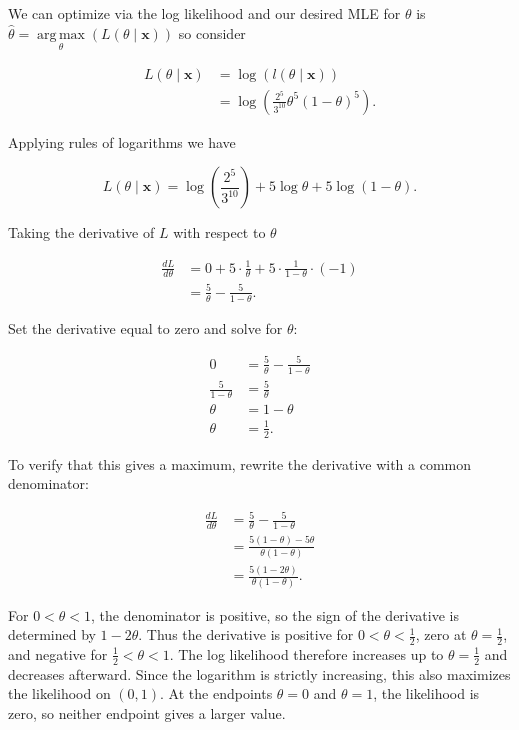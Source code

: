 \documentclass[12pt]{article}
\begin{document}
\begin{enumerate}
We can optimize via the log likelihood and our desired MLE for $\theta$ is $\hat{\theta} = \operatorname*{arg\,max}\limits_{\theta}\left( L(\theta \mid \mathbf{x})\right)$ so consider 

\[
\begin{aligned}
L(\theta \mid \mathbf{x})
&= \log\left(l(\theta \mid \mathbf{x})\right) \\
&= \log\left(\frac{2^5}{3^{10}}\theta^5(1-\theta)^5\right).
\end{aligned}
\]

Applying rules of logarithms we have

\[
L(\theta \mid \mathbf{x}) = \log\left(\frac{2^5}{3^{10}}\right) + 5 \log \theta + 5 \log(1-\theta).
\]

Taking the derivative of $L$ with respect to $\theta$

\[
\begin{aligned}
\frac{dL}{d\theta}
&= 0 + 5\cdot \frac{1}{\theta} + 5\cdot \frac{1}{1-\theta}\cdot (-1) \\
&= \frac{5}{\theta} - \frac{5}{1-\theta}.
\end{aligned}
\]

Set the derivative equal to zero and solve for $\theta$:

\[
\begin{aligned}
0 &= \frac{5}{\theta} - \frac{5}{1-\theta} \\
\frac{5}{1-\theta} &= \frac{5}{\theta} \\
\theta &= 1 - \theta \\
\theta &= \frac{1}{2}.
\end{aligned}
\]

To verify that this gives a maximum, rewrite the derivative with a common denominator:

\[
\begin{aligned}
\frac{dL}{d\theta}
&= \frac{5}{\theta} - \frac{5}{1-\theta} \\
&= \frac{5(1-\theta)-5\theta}{\theta(1-\theta)} \\
&= \frac{5(1-2\theta)}{\theta(1-\theta)}.
\end{aligned}
\]

For $0<\theta<1$, the denominator is positive, so the sign of the derivative is determined by $1-2\theta$. Thus the derivative is positive for $0<\theta<\frac{1}{2}$, zero at $\theta=\frac{1}{2}$, and negative for $\frac{1}{2}<\theta<1$. The log likelihood therefore increases up to $\theta=\frac{1}{2}$ and decreases afterward. Since the logarithm is strictly increasing, this also maximizes the likelihood on $(0,1)$. At the endpoints $\theta=0$ and $\theta=1$, the likelihood is zero, so neither endpoint gives a larger value.


\end{enumerate}
\end{document}
